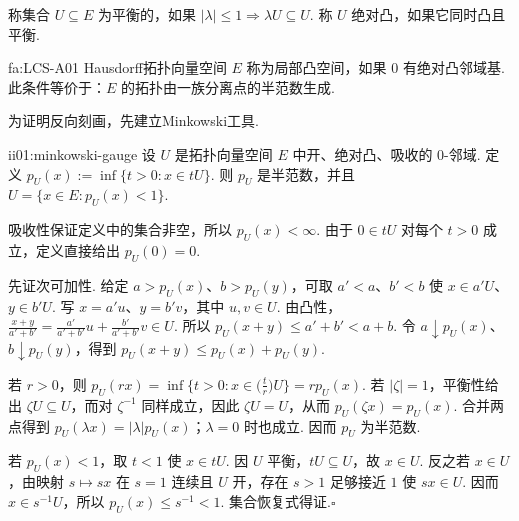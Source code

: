 称集合 \(\displaystyle U\subseteq E\) 为平衡的，如果 \(\displaystyle |\lambda|\leqslant1\Rightarrow\lambda U\subseteq U\). 称 \(\displaystyle U\) 绝对凸，如果它同时凸且平衡.

\begin{FADefinition}[A][局部凸空间与半范数刻画]{fa:LCS-A01}
Hausdorff拓扑向量空间 \(\displaystyle E\) 称为局部凸空间，如果 \(\displaystyle0\) 有绝对凸邻域基. 此条件等价于：\(\displaystyle E\) 的拓扑由一族分离点的半范数生成.
\end{FADefinition}

为证明反向刻画，先建立Minkowski工具.

\begin{FALemma}[B][开绝对凸集的Minkowski泛函]{ii01:minkowski-gauge}
设 \(\displaystyle U\) 是拓扑向量空间 \(\displaystyle E\) 中开、绝对凸、吸收的 \(\displaystyle0\)-邻域. 定义
\(\displaystyle p_U(x) := \inf\{t>0:x\in tU\}.\)
则 \(\displaystyle p_U\) 是半范数，并且
\(\displaystyle U=\{x\in E:p_U(x)<1\}.\)
\end{FALemma}

\begin{FAProof}
吸收性保证定义中的集合非空，所以 \(\displaystyle p_U(x)<\infty\). 由于 \(\displaystyle0\in tU\) 对每个 \(\displaystyle t>0\) 成立，定义直接给出 \(\displaystyle p_U(0)=0\).

先证次可加性. 给定 \(\displaystyle a>p_U(x)\)、\(\displaystyle b>p_U(y)\)，可取 \(\displaystyle a'<a\)、\(\displaystyle b'<b\) 使 \(\displaystyle x\in a'U\)、\(\displaystyle y\in b'U\). 写 \(\displaystyle x=a'u\)、\(\displaystyle y=b'v\)，其中 \(\displaystyle u,v\in U\). 由凸性，
\(\displaystyle \frac{x+y}{a'+b'} = \frac{a'}{a'+b'}u+ \frac{b'}{a'+b'}v \in U.\)
所以 \(\displaystyle p_U(x+y)\leqslant a'+b'<a+b\). 令 \(\displaystyle a\downarrow p_U(x)\)、\(\displaystyle b\downarrow p_U(y)\)，得到 \(\displaystyle p_U(x+y)\leqslant p_U(x)+p_U(y)\).

若 \(\displaystyle r>0\)，则
\(\displaystyle p_U(rx) = \inf\{t>0:x\in \bigl(\frac{t}{r}\bigr)U\} = r p_U(x).\)
若 \(\displaystyle |\zeta|=1\)，平衡性给出 \(\displaystyle \zeta U\subseteq U\)，而对 \(\displaystyle \zeta^{-1}\) 同样成立，因此 \(\displaystyle \zeta U=U\)，从而 \(\displaystyle p_U(\zeta x)=p_U(x)\). 合并两点得到 \(\displaystyle p_U(\lambda x)=|\lambda|p_U(x)\)；\(\displaystyle \lambda=0\) 时也成立. 因而 \(\displaystyle p_U\) 为半范数.

若 \(\displaystyle p_U(x)<1\)，取 \(\displaystyle t<1\) 使 \(\displaystyle x\in tU\). 因 \(\displaystyle U\) 平衡，\(\displaystyle tU\subseteq U\)，故 \(\displaystyle x\in U\). 反之若 \(\displaystyle x\in U\)，由映射 \(\displaystyle s\mapsto sx\) 在 \(\displaystyle s=1\) 连续且 \(\displaystyle U\) 开，存在 \(\displaystyle s>1\) 足够接近 \(\displaystyle1\) 使 \(\displaystyle sx\in U\). 因而 \(\displaystyle x\in s^{-1}U\)，所以 \(\displaystyle p_U(x)\leqslant s^{-1}<1\). 集合恢复式得证.\hfill\(\square\)
\end{FAProof}

